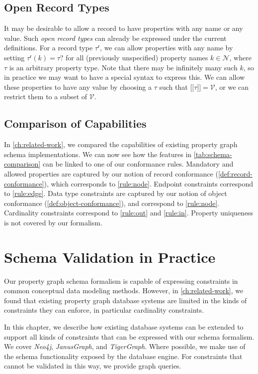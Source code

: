 \documentclass{report}
\theoremstyle{definition}
\newcommand{\ptype}{\tau}
\newcommand{\rtype}{\tau^\mathsf{r}}
\newcommand{\lsem}{\ensuremath{[\![}}
\newcommand{\rsem}{\ensuremath{]\!]}}
\newcommand{\sem}[1]{\ensuremath{\lsem #1 \rsem}}
\begin{document}
\section{Open Record Types}

It may be desirable to allow a record to have properties with any name or any value. Such \emph{open record types} can already be expressed under the current definitions. For a record type $\rtype$, we can allow properties with any name by setting $\rtype(k) = \ptype?$ for all (previously unspecified) property names $k \in \mathcal{N}$, where $\ptype$ is an arbitrary property type. Note that there may be infinitely many such $k$, so in practice we may want to have a special syntax to express this. We can allow these properties to have any value by choosing a $\ptype$ such that $\sem{\ptype} = \mathcal{V}$, or we can restrict them to a subset of $\mathcal{V}$.

\section{Comparison of Capabilities}

In \autoref{ch:related-work}, we compared the capabilities of existing property graph schema implementations. We can now see how the features in \autoref{tab:schema-comparison} can be linked to one of our conformance rules. Mandatory and allowed properties are captured by our notion of record conformance (\autoref{def:record-conformance}), which corresponds to \autoref{rule:node}. Endpoint constraints correspond to \autoref{rule:edge}. Data type constraints are captured by our notion of object conformance (\autoref{def:object-conformance}), and correspond to \autoref{rule:node}. Cardinality constraints correspond to \autoref{rule:out} and \ref{rule:in}. Property uniqueness is not covered by our formalism.

\chapter{Schema Validation in Practice}
\label{ch:practice}

Our property graph schema formalism is capable of expressing constraints in common conceptual data modeling methods. However, in \autoref{ch:related-work}, we found that existing property graph database systems are limited in the kinds of constraints they can enforce, in particular cardinality constraints.

In this chapter, we describe how existing database systems can be extended to support all kinds of constraints that can be expressed with our schema formalism. We cover \emph{Neo4j}, \emph{JanusGraph}, and \emph{TigerGraph}. Where possible, we make use of the schema functionality exposed by the database engine. For constraints that cannot be validated in this way, we provide graph queries.
\end{document}
